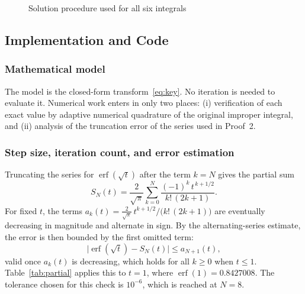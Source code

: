 \documentclass[12pt,a4paper]{article}
\theoremstyle{definition}
\theoremstyle{plain}
\theoremstyle{remark}
\newcommand{\erf}{\operatorname{erf}}
\begin{document}
	\begin{figure}[htbp]
		\centering
		\caption{Solution procedure used for all six integrals}
		\label{fig:flow}
	\end{figure}
	
	\subsection{Implementation and Code}
	
	\subsubsection{Mathematical model}
	
	The model is the closed-form transform~\eqref{eq:key}. No iteration is needed to evaluate it. Numerical work enters in only two places: (i) verification of each exact value by adaptive numerical quadrature of the original improper integral, and (ii) analysis of the truncation error of the series used in Proof~2.
	
	\subsubsection{Step size, iteration count, and error estimation}
	
	Truncating the series for $\erf(\sqrt{t})$ after the term $k=N$ gives the partial sum
	\[
	S_N(t)=\frac{2}{\sqrt{\pi}}\sum_{k=0}^{N}\frac{(-1)^k\,t^{\,k+1/2}}{k!\,(2k+1)} .
	\]
	For fixed $t$, the terms $a_k(t)=\tfrac{2}{\sqrt{\pi}}\,t^{k+1/2}/\bigl(k!\,(2k+1)\bigr)$ are eventually decreasing in magnitude and alternate in sign. By the alternating-series estimate, the error is then bounded by the first omitted term:
	\begin{equation}\label{eq:bound}
		\bigl|\erf(\sqrt{t})-S_N(t)\bigr|\le a_{N+1}(t),
	\end{equation}
	valid once $a_k(t)$ is decreasing, which holds for all $k\ge 0$ when $t\le 1$. Table~\ref{tab:partial} applies this to $t=1$, where $\erf(1)=0.8427008$. The tolerance chosen for this check is $10^{-6}$, which is reached at $N=8$.
	
\end{document}
